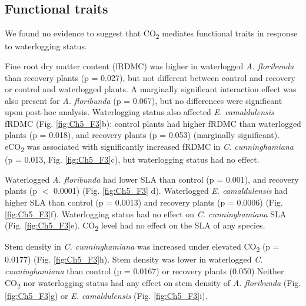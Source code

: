 \documentclass[12pt,a4paper]{memoir}
\begin{document}
\subsection{Functional traits}
We found no evidence to suggest that CO\textsubscript{2} mediates functional traits in response to waterlogging status.

Fine root dry matter content (fRDMC) was higher in waterlogged \textit{A. floribunda} than recovery plants (p = 0.027), but not different between control and recovery or control and waterlogged plants. A marginally significant interaction effect was also present for \textit{A. floribunda} (p = 0.067), but no differences were significant upon post-hoc analysis. Waterlogging status also affected \textit{E. camaldulensis} fRDMC (Fig. \ref{fig:Ch5_F3}b): control plants had higher fRDMC than waterlogged plants (p = 0.018), and recovery plants (p = 0.053) (marginally significant). eCO\textsubscript{2} was associated with significantly increased fRDMC in \textit{C. cunninghamiana} (p = 0.013, Fig. \ref{fig:Ch5_F3}c), but waterlogging status had no effect.

Waterlogged \textit{A. floribunda} had lower SLA than control (p = 0.001), and recovery plants (p $<$ 0.0001) (Fig. \ref{fig:Ch5_F3} d). Waterlogged \textit{E. camaldulensis} had higher SLA than control (p = 0.0013) and recovery plants (p = 0.0006) (Fig. \ref{fig:Ch5_F3}f). Waterlogging status had no effect on \textit{C. cunninghamiana} SLA (Fig. \ref{fig:Ch5_F3}e). CO\textsubscript{2} level had no effect on the SLA of any species. 

Stem density in \textit{C. cunninghamiana} was increased under elevated CO\textsubscript{2} (p = 0.0177) (Fig. \ref{fig:Ch5_F3}h). Stem density was lower in waterlogged \textit{C. cunninghamiana} than control (p = 0.0167) or recovery plants (0.050) Neither CO\textsubscript{2} nor waterlogging status had any effect on stem density of \textit{A. floribunda} (Fig. \ref{fig:Ch5_F3}g) or \textit{E. camaldulensis} (Fig. \ref{fig:Ch5_F3}i).
\end{document}

